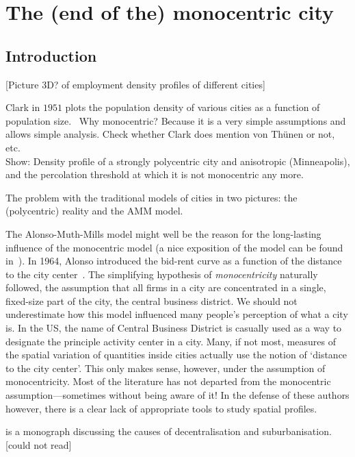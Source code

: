 %
\chapter{The (end of the) monocentric city}
\label{chap:monocentric_introduction}


\section{Introduction}
\label{sec:introduction}

[Picture 3D? of employment density profiles of different cities]

Clark in $1951$ plots the population density of various cities as a function of
population size.~\cite{Clark:1951}
Why monocentric? Because it is a very simple assumptions and allows simple
analysis. Check whether Clark does mention von Th\"unen or not, etc.\\


Show: Density profile of a strongly polycentric city and anisotropic
(Minneapolis), and the percolation threshold at which it is not monocentric any
more.

The problem with the traditional models of cities in two pictures: the
(polycentric) reality and the AMM model.


The Alonso-Muth-Mills model might well be the reason for the long-lasting influence of
the monocentric model (a nice exposition of the model can be found
in~\cite{Fujita:1989}). In 1964, Alonso introduced the bid-rent curve as a
function of the distance to the city center~\cite{Alonso:1964}. The simplifying hypothesis of
\emph{monocentricity} naturally followed, the assumption that all firms in a
city are concentrated in a single, fixed-size part of the city, the central business
district. We should not underestimate how this model influenced many people's
perception of what a city is. In the US, the name of Central Business District
is casually used as a way to designate the principle activity center in a city.
Many, if not most, measures of the spatial variation of quantities inside cities
actually use the notion of `distance to the city center'. This only makes sense,
however, under the assumption of monocentricity. Most of the
literature has not departed from the monocentric assumption---sometimes without
being aware of it! In the defense of these authors however, there is a clear
lack of appropriate tools to study spatial profiles.


\cite{Mills:1972} is a monograph discussing the causes of decentralisation and
suburbanisation. [could not read]

